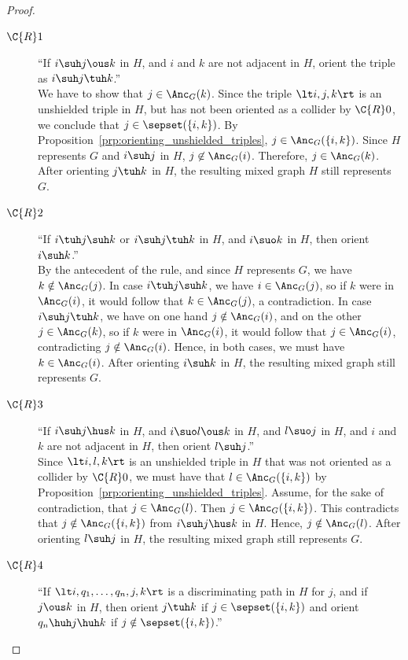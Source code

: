 \begin{proof}
  \begin{description}
    \item[$\C{R}1$] ``If $i \suh j \ous k$ in $H$, and $i$ and $k$ are not adjacent in $H$, orient the triple as $i \suh j \tuh k$.''\\
      We have to show that $j \in \Anc_G(k)$.
      Since the triple $\lt i, j, k \rt$ is an unshielded triple in $H$, but has not been oriented as a collider by $\C{R}0$, we conclude that $j \in \sepset(\{i,k\})$. 
      By Proposition~\ref{prp:orienting_unshielded_triples}, $j \in \Anc_G(\{i,k\})$.
      Since $H$ represents $G$ and $i \suh j$ in $H$, $j \not\in \Anc_G(i)$. 
      Therefore, $j \in \Anc_G(k)$.
      After orienting $j \tuh k$ in $H$, the resulting mixed graph $H$ still represents $G$.
    \item[$\C{R}2$] ``If $i \tuh j \suh k$ or $i \suh j \tuh k$ in $H$, and $i \suo k$ in $H$, then orient $i \suh k$.''\\
      By the antecedent of the rule, and since $H$ represents $G$, we have $k \notin \Anc_G(j)$.
      In case $i \tuh j \suh k$, we have $i \in \Anc_G(j)$, so if $k$ were in $\Anc_G(i)$, it would follow that $k \in \Anc_G(j)$, a contradiction.
      In case $i \suh j \tuh k$, we have on one hand $j \notin \Anc_G(i)$, and on the other $j \in \Anc_G(k)$, so if $k$ were in $\Anc_G(i)$, it would follow that $j \in \Anc_G(i)$, contradicting $j \notin \Anc_G(i)$.
      Hence, in both cases, we must have $k \in \Anc_G(i)$.
      After orienting $i \suh k$ in $H$, the resulting mixed graph still represents $G$.
    \item[$\C{R}3$] ``If $i \suh j \hus k$ in $H$, and $i \suo l \ous k$ in $H$, and $l \suo j$ in $H$, and $i$ and $k$ are not adjacent in $H$, then orient $l \suh j$.''\\
      Since $\lt i, l, k \rt$ is an unshielded triple in $H$ that was not oriented as a collider by $\C{R}0$, we must have that $l \in \Anc_G(\{i,k\})$ by Proposition~\ref{prp:orienting_unshielded_triples}.
      Assume, for the sake of contradiction, that $j \in \Anc_G(l)$. 
      Then $j \in \Anc_G(\{i,k\})$.
      This contradicts that $j \notin \Anc_G(\{i,k\})$ from $i \suh j \hus k$ in $H$.
      Hence, $j \notin \Anc_G(l)$.
      After orienting $l \suh j$ in $H$, the resulting mixed graph still represents $G$.
    \item[$\C{R}4$] ``If $\lt i, q_1, \dots, q_n, j, k \rt$ is a discriminating path in $H$ for $j$, and if $j \ous k$ in $H$, then orient $j \tuh k$ if $j \in \sepset(\{i,k\})$ and orient $q_n \huh j \huh k$ if $j \notin \sepset(\{i,k\})$.''\\

\end{description}
\end{proof}
